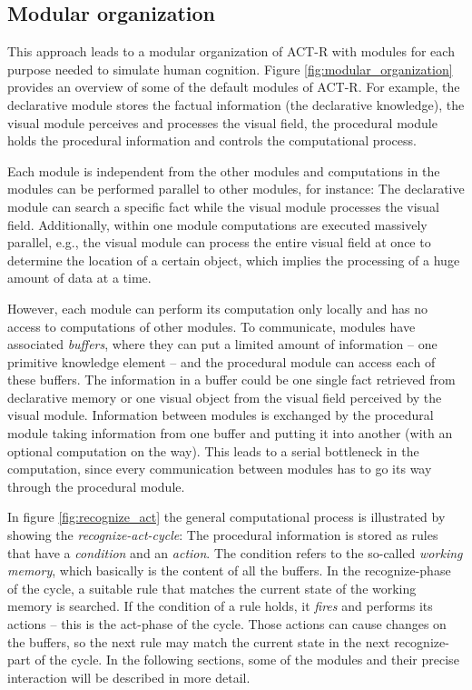 \subsection{Modular organization}

This approach leads to a modular organization of ACT-R with modules for each purpose needed to simulate human cognition. Figure \ref{fig:modular_organization} provides an overview of some of the default modules of ACT-R. For example, the declarative module stores the factual information (the declarative knowledge), the visual module perceives and processes the visual field, the procedural module holds the procedural information and controls the computational process. 

Each module is independent from the other modules and computations in the modules can be performed parallel to other modules, for instance: The declarative module can search a specific fact while the visual module processes the visual field. Additionally, within one module computations are executed massively parallel, e.g., the visual module can process the entire visual field at once to determine the location of a certain object, which implies the processing of a huge amount of data at a time.

However, each module can perform its computation only locally and has no access to computations of other modules. To communicate, modules have associated \emph{buffers}, where they can put a limited amount of information -- one primitive knowledge element -- and the procedural module can access each of these buffers. The information in a buffer could be one single fact retrieved from declarative memory or one visual object from the visual field perceived by the visual module. Information between modules is exchanged by the procedural module taking information from one buffer and putting it into another (with an optional computation on the way). This leads to a serial bottleneck in the computation, since every communication between modules has to go its way through the procedural module.

In figure \ref{fig:recognize_act} the general computational process is illustrated by showing the \emph{recognize-act-cycle}: The procedural information is stored as rules that have a \emph{condition} and an \emph{action}. The condition refers to the so-called \emph{working memory}, which basically is the content of all the buffers. In the recognize-phase of the cycle, a suitable rule that matches the current state of the working memory is searched. If the condition of a rule holds, it \emph{fires} and performs its actions -- this is the act-phase of the cycle. Those actions can cause changes on the buffers, so the next rule may match the current state in the next recognize-part of the cycle. In the following sections, some of the modules and their precise interaction will be described in more detail.

